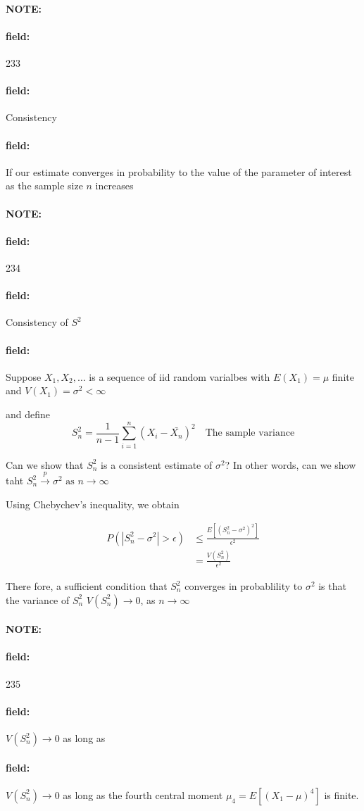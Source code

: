 \documentclass[12pt]{article}
\newenvironment{note}{\paragraph{NOTE:}}{}
\newenvironment{field}{\paragraph{field:}}{}
\begin{document}

\begin{note} \begin{field} \tiny 233 \end{field}
  \begin{field}
    Consistency
  \end{field}
  \begin{field}
    If our estimate converges in probability to the value of the parameter of interest as the sample size $n$ increases
  \end{field}
\end{note}

\begin{note} \begin{field} \tiny 234 \end{field}
  \begin{field}
    Consistency of $S^2$
  \end{field}
  \begin{field}
    Suppose $X_1, X_2, \ldots$ is a sequence of iid random varialbes with $E(X_1) = \mu$ finite and $V(X_1) = \sigma^2 < \infty$

    and define $$ S_n^2 = \frac{1}{n-1}\sum_{i = 1}^n(X_i - \bar{X_n})^2 \quad \text{The sample variance}$$

    Can we show that $S_n^2$ is a consistent estimate of $\sigma^2$? In other words, can we show taht $S_n^2 \overset{p}{\to} \sigma^2 \text{ as } n \to \infty$

    Using Chebychev's inequality, we obtain

    \begin{align*}
      P(|S_n^2 - \sigma^2| > \epsilon ) &\leq \frac{E[(S_n^2 - \sigma^2)^2]}{\epsilon^2}\\
      &= \frac{V(S_n^2)}{\epsilon^2}
    \end{align*}

    There fore, a sufficient condition that $S_n^2$ converges in probablility to $\sigma^2$ is that the variance of $S_n^2$  $V(S_n^2) \to 0$, as $n \to \infty$
  \end{field}
\end{note}

\begin{note} \begin{field} \tiny 235 \end{field}
  \begin{field}
    $V(S_n^2) \to 0$ as long as
  \end{field}
  \begin{field}
    $V(S_n^2) \to 0$ as long as the fourth central moment $\mu_4 = E[(X_1 - \mu)^4]$ is finite.
  \end{field}
\end{note}
\end{document}

